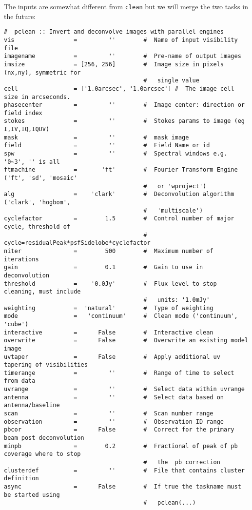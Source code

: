 The inputs are somewhat different from {\tt clean} but we will merge
the two tasks in the future: 
\small
\begin{verbatim}
#  pclean :: Invert and deconvolve images with parallel engines
vis                 =         ''        #  Name of input visibility file
imagename           =         ''        #  Pre-name of output images
imsize              = [256, 256]        #  Image size in pixels (nx,ny), symmetric for
                                        #   single value
cell                = ['1.0arcsec', '1.0arcsec'] #  The image cell size in arcseconds.
phasecenter         =         ''        #  Image center: direction or field index
stokes              =         ''        #  Stokes params to image (eg I,IV,IQ,IQUV)
mask                =         ''        #  mask image
field               =         ''        #  Field Name or id
spw                 =         ''        #  Spectral windows e.g. '0~3', '' is all
ftmachine           =       'ft'        #  Fourier Transform Engine ('ft', 'sd', 'mosaic'
                                        #   or 'wproject')
alg                 =    'clark'        #  Deconvolution algorithm ('clark', 'hogbom',
                                        #   'multiscale')
cyclefactor         =        1.5        #  Control number of major cycle, threshold of
                                        #   cycle=residualPeak*psfSidelobe*cyclefactor
niter               =        500        #  Maximum number of iterations
gain                =        0.1        #  Gain to use in deconvolution
threshold           =    '0.0Jy'        #  Flux level to stop cleaning, must include
                                        #   units: '1.0mJy'
weighting           =  'natural'        #  Type of weighting
mode                =   'continuum'     #  Clean mode ('continuum', 'cube')
interactive         =      False        #  Interactive clean
overwrite           =      False        #  Overwrite an existing model image
uvtaper             =      False        #  Apply additional uv tapering of visibilities
timerange           =         ''        #  Range of time to select from data
uvrange             =         ''        #  Select data within uvrange
antenna             =         ''        #  Select data based on antenna/baseline
scan                =         ''        #  Scan number range
observation         =         ''        #  Observation ID range
pbcor               =      False        #  Correct for the primary beam post deconvolution
minpb               =        0.2        #  Fractional of peak of pb coverage where to stop
                                        #   the  pb correction
clusterdef          =         ''        #  File that contains cluster definition
async               =      False        #  If true the taskname must be started using
                                        #   pclean(...)
\end{verbatim}
\normalsize

